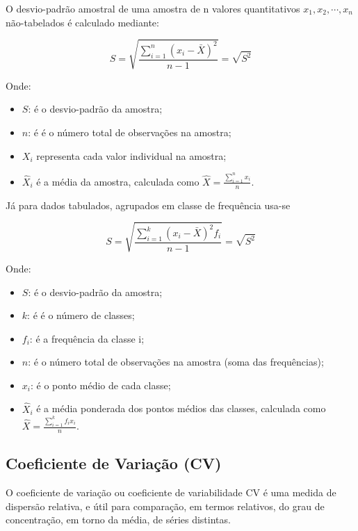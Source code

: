 O desvio-padrão amostral de uma amostra de n valores quantitativos $x_{1}, x_{2}, \cdots, x_{n}$ não-tabelados é calculado mediante:

\begin{equation}\label{dp}
    S = \sqrt{\frac{\sum_{i=1}^{n}(x_{i}-\bar{X})^{2}}{n-1}} = \sqrt{S^{2}}
\end{equation}

Onde:

\begin{itemize}
    \item $S$: é o desvio-padrão da amostra;
    \item $n$: é é o número total de observações na amostra;
    \item $X_{i}$ representa cada valor individual na amostra;
    \item $\hat{X}_{i}$ é a média da amostra, calculada como $\hat{X}=\frac{\sum_{i=1}^{n} x_{i}}{n}$.
\end{itemize}
\vskip0.3cm

Já para dados tabulados, agrupados em classe de frequência usa-se

\begin{equation}\label{dp}
    S = \sqrt{\frac{\sum_{i=1}^{k}(x_{i}-\bar{X})^{2}f_{i}}{n-1}} = \sqrt{S^{2}}
\end{equation}

Onde:

\begin{itemize}
    \item $S$: é o desvio-padrão da amostra;
    \item $k$: é é o número de classes;
    \item $f_{i}$: é a frequência da classe i;
    \item $n$: é o número total de observações na amostra (soma das frequências);
    \item $x_{i}$: é o ponto médio de cada classe;
    \item $\hat{X}_{i}$ é a média ponderada dos pontos médios das classes, calculada como $\hat{X} = \frac{\sum_{i=1}^{k} f_{i} x_{i}}{n}$.
\end{itemize}
\vskip0.3cm


\subsection{Coeficiente de Variação (CV)}

O coeficiente de variação ou coeficiente de variabilidade CV é uma medida de dispersão relativa, e útil para comparação, em termos relativos, do grau de concentração, em torno da média, de séries distintas.\vskip0.3cm 

